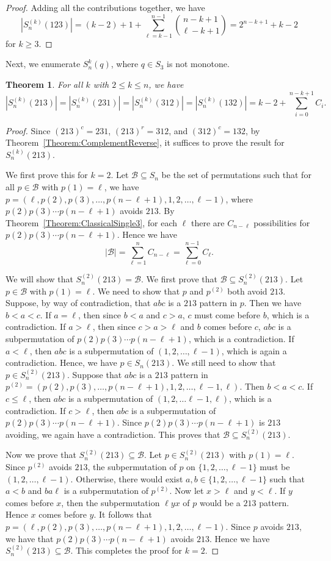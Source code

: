 \documentclass[10pt,a4paper]{amsart}
\newtheorem{theorem}{Theorem}[section]
\numberwithin{equation}{section}
\begin{document}
\begin{proof}
Adding all the contributions together, we have
\[
|S_n^{(k)}(123)|=(k-2)+1+\sum_{\ell=k-1}^{n-1}\binom{n-k+1}{\ell-k+1}=2^{n-k+1}+k-2
\]
for $k\geq3$.
\end{proof}
Next, we enumerate $S_n^{k}(q)$, where $q\in S_3$ is not monotone.
\begin{theorem}\label{Theorem:NonMonotonePatterns}
    For all $k$ with $2\leq k\leq n$, we have
    \[
|S_n^{(k)}(213)|=|S_n^{(k)}(231)|=|S_n^{(k)}(312)|=|S_n^{(k)}(132)|=k-2+\sum_{i=0}^{n-k+1}C_i.
    \]
\end{theorem}
\begin{proof}
Since $(213)^c=231$, $(213)^r=312$, and $(312)^c=132$, by Theorem~\ref{Theorem:ComplementReverse}, it suffices to prove the result for $S_n^{(k)}(213)$.

We first prove this for $k=2$. Let $\mathcal{B}\subseteq S_n$ be the set of permutations such 
that for all $p\in\mathcal{B}$ with $p(1)=\ell$, 
we have $p=(\ell,p(2),p(3),\ldots,p(n-\ell+1),1,2,\ldots,\ell-1)$, where $p(2)p(3)\cdots p(n-\ell+1)$ 
avoids $213$.  By Theorem~\ref{Theorem:ClassicalSingle3}, for each $\ell$ there are $C_{n-\ell}$ 
possibilities for $p(2)p(3)\cdots p(n-\ell+1)$. Hence we have
\[
|\mathcal{B}|=\sum_{\ell=1}^nC_{n-\ell}=\sum_{\ell=0}^{n-1}C_\ell.
\]

We will show that $S_n^{(2)}(213)=\mathcal{B}$. We first prove that $\mathcal{B}\subseteq S_n^{(2)}(213)$. Let $p\in\mathcal{B}$ with $p(1)=\ell$. We need to show that $p$ and $p^{(2)}$ both avoid $213$. 
Suppose, by way of contradiction, that $abc$ is a $213$ pattern in $p$. Then we have $b<a<c$. If $a=\ell$, 
then since $b<a$ and $c>a$, $c$ must come before $b$, which is a contradiction. 
If $a>\ell$, then since $c>a>\ell$ and $b$ comes before $c$, $abc$ is a subpermutation of $p(2)p(3)\cdots p(n-\ell+1)$, which is a contradiction. If $a<\ell$, then $abc$ is a subpermutation of $(1,2,\ldots,\ell-1)$, which is again a contradiction. Hence, we have $p\in S_n(213)$. We still need to show that $p\in S_n^{(2)}(213)$. 
Suppose that $abc$ is a $213$ pattern in $p^{(2)}=(p(2),p(3),\ldots,p(n-\ell+1),1,2,\ldots,\ell-1,\ell)$. Then $b<a<c$. If $c\leq\ell$, then $abc$ is a 
subpermutation of $(1,2,\ldots\ell-1,\ell)$, which is a contradiction. If $c>\ell$, then $abc$ is a 
subpermutation of $p(2)p(3)\cdots p(n-\ell+1)$. Since $p(2)p(3)\cdots p(n-\ell+1)$ is $213$ avoiding, we again have a contradiction. This proves that $\mathcal{B}\subseteq S_n^{(2)}(213)$.

Now we prove that $S_n^{(2)}(213)\subseteq\mathcal{B}$. Let $p\in S_n^{(2)}(213)$ with $p(1)=\ell$. Since $p^{(2)}$ avoids $213$, the subpermutation of $p$ on $\{1,2,\ldots,\ell-1\}$ must be $(1,2,\ldots,\ell-1)$. Otherwise, there would exist $a,b\in\{1,2,\ldots,\ell-1\}$ such that $a<b$ and $ba\ell$ is a subpermutation of $p^{(2)}$. Now let $x>\ell$ and $y<\ell$. If $y$ comes before $x$, then the subpermutation $\ell yx$ of $p$ would be a $213$ pattern. Hence $x$ comes before $y$. It follows that $p=(\ell,p(2),p(3),\ldots,p(n-\ell+1),1,2,\ldots,\ell-1)$. Since $p$ avoids $213$, we 
have that $p(2)p(3)\cdots p(n-\ell+1)$ avoids $213$. Hence we have $S_n^{(2)}(213)\subseteq\mathcal{B}$. This completes the proof for $k=2$.


\end{proof}
\end{document}
